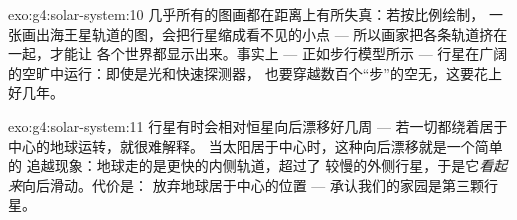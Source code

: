 \begin{solution}{exo:g4:solar-system:10}
几乎所有的图画都在距离上有所失真：若按比例绘制，
一张画出海王星轨道的图，会把行星缩成看不见的小点 ---
所以画家把各条轨道挤在一起，才能让
各个世界都显示出来。事实上 --- 正如步行模型所示 ---
行星在广阔的空旷中运行：即使是光和快速探测器，
也要穿越数百个“步”的空无，这要花上好几年。
\end{solution}

\begin{solution}{exo:g4:solar-system:11}
行星有时会相对恒星向后漂移好几周 ---
若一切都绕着居于中心的地球运转，就很难解释。
当太阳居于中心时，这种向后漂移就是一个简单的
追越现象：地球走的是更快的内侧轨道，超过了
较慢的外侧行星，于是它\emph{看起来}向后滑动。代价是：
放弃地球居于中心的位置 ---
承认我们的家园是第三颗行星。
\end{solution}
